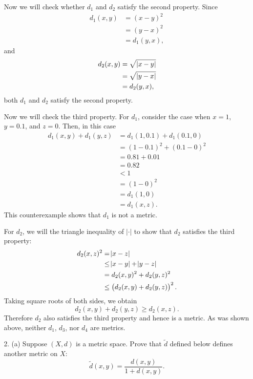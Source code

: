 \documentclass{article}
\begin{document}
Now we will check whether $d_1$ and $d_2$ satisfy the second property.
Since
%
\begin{align*}
    d_1(x, y) &= (x - y)^2 \\
              &= (y - x)^2 \\
              &= d_1(y, x),
\end{align*}
%
and
%
\begin{align*}
    d_2(x, y) &= \sqrt{\, \envert{x - y}} \\
              &= \sqrt{\, \envert{y - x}} \\
              &= d_2(y, x),
\end{align*}
%
both $d_1$ and $d_2$ satisfy the second property.

Now we will check the third property. For $d_1$, consider the case when
$x = 1$, $y = 0.1$, and $z = 0$. Then, in this case
%
\begin{align*}
    d_1(x, y) + d_1(y, z)
        &= d_1(1, 0.1) + d_1(0.1, 0) \\
        &= (1 - 0.1)^2 + (0.1 - 0)^2 \\
        &= 0.81 + 0.01 \\
        &= 0.82 \\
        &< 1 \\
        &= (1 - 0)^2 \\
        &= d_1(1, 0) \\
        &= d_1(x, z)
        .
\end{align*}
%
This counterexample shows that $d_1$ is not a metric.

For $d_2$, we will the triangle inequality of $|\cdot|$ to show that
$d_2$ satisfies the third property:
%
\begin{align*}
    d_2(x, z)^2
        &= \envert{x - z} \\
        &\leq \envert{x - y} + \envert{y - z} \\
        &= d_2(x, y)^2 + d_2(y, z)^2 \\
        &\leq \del{d_2(x, y) + d_2(y, z)}^2
        .
\end{align*}
%
Taking square roots of both sides, we obtain
%
\begin{equation*}
    d_2(x, y) + d_2(y, z) \geq d_2(x, z)
    .
\end{equation*}
%
Therefore $d_2$ also satisfies the third property and hence is a metric.
As was shown above, neither $d_1$, $d_3$, nor $d_4$ are metrics.

\newpage

2. (a) Suppose $(X, d)$ is a metric space. Prove that $\tilde{d}$
   defined below defines another metric on $X$:
%
\begin{equation*}
    \tilde{d} (x, y) = \frac{d(x,y)}{1 + d(x,y)}
    .
\end{equation*}
\end{document}
